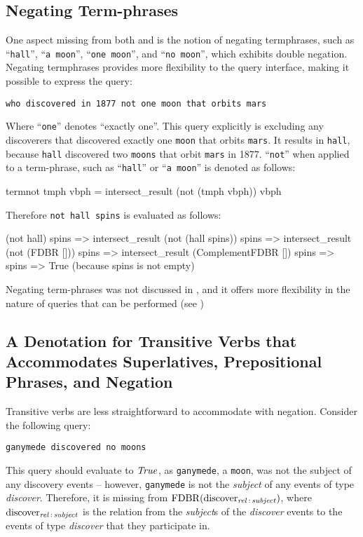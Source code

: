 \documentclass[../main.tex]{subfiles}
\begin{document}
\begin{refsection}
\subsection{Negating Term-phrases}

One aspect missing from both \cite{ferre2014squall} and \cite{frostboulos2002} is the notion
of negating termphrases, such as ``\texttt{hall}'', ``\texttt{a moon}'', ``\texttt{one moon}'', and ``\texttt{no moon}'', which exhibits double negation.  Negating termphrases provides more flexibility to the query interface, making it possible to express the query:

\begin{center}
	\texttt{who discovered in 1877 not one moon that orbits mars}
\end{center}
Where ``\texttt{one}'' denotes ``exactly one''.  This query explicitly is excluding any discoverers that discovered exactly one \texttt{moon} that orbits \texttt{mars}.  It results in \texttt{hall}, because \texttt{hall} discovered two \texttt{moons} that orbit \texttt{mars} in 1877.
``\texttt{not}'' when applied to a term-phrase, such as ``\texttt{hall}'' or ``\texttt{a moon}'' is denoted as follows:
\begin{code}
    termnot tmph vbph = intersect_result (not (tmph vbph)) vbph
\end{code}
Therefore \texttt{not hall spins} is evaluated as follows:
\begin{code}
       (not hall) spins
    => intersect_result (not (hall spins)) spins
    => intersect_result (not (FDBR [])) spins
    => intersect_result (ComplementFDBR []) spins
    => spins
    => True  (because spins is not empty)
\end{code}
Negating term-phrases was not discussed in \cite{frostboulos2002}, and it offers more flexibility
in the nature of queries that can be performed (see )


\subsection{A Denotation for Transitive Verbs that Accommodates Superlatives, Prepositional Phrases, and Negation}
\label{subsec:tvs}

Transitive verbs are less straightforward to accommodate with negation.  Consider the following query:
\begin{center}
    \texttt{ganymede discovered no moons}
\end{center}
\noindent This query should evaluate to $\operatorname{\mathit{True}}$, as \texttt{ganymede}, a \texttt{moon}, was not the subject of any discovery events -- however, \texttt{ganymede} is not the \textit{subject} of any events of type \textit{discover}.  Therefore, it is missing from $\operatorname{FDBR}({\operatorname{discover}_{\operatorname{\mathit{rel}}\,:\,\operatorname{\mathit{subject}}}})$, where $\operatorname{discover}_{\operatorname{\mathit{rel}}\,:\,\operatorname{\mathit{subject}}}$ is the relation from the \textit{subject}s of the \textit{discover} events to the events of type \textit{discover} that they participate in.


\end{refsection}
\end{document}
